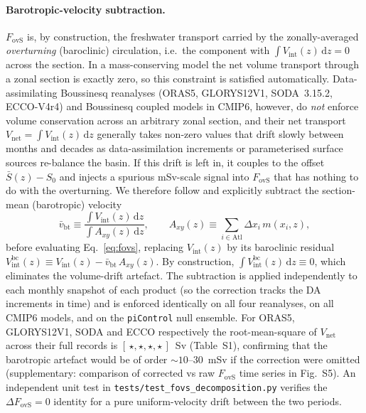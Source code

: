 \documentclass[12pt,a4paper]{article}
\newcommand{\Fovs}{F_\mathrm{ovS}}
\begin{document}
\paragraph{Barotropic-velocity subtraction.}
$\Fovs$ is, by construction, the freshwater transport carried by
the zonally-averaged \emph{overturning} (baroclinic) circulation,
i.e.\ the component with $\int V_\mathrm{int}(z)\,\mathrm{d}z = 0$
across the section. In a mass-conserving model the net volume
transport through a zonal section is exactly zero, so this
constraint is satisfied automatically. Data-assimilating Boussinesq
reanalyses (ORAS5, GLORYS12V1, SODA~3.15.2, ECCO-V4r4) and
Boussinesq coupled models in CMIP6, however, do \emph{not} enforce
volume conservation across an arbitrary zonal section, and their
net transport $V_\mathrm{net} = \int V_\mathrm{int}(z)\,\mathrm{d}z$
generally takes non-zero values that drift slowly between months and
decades as data-assimilation increments or parameterised surface
sources re-balance the basin. If this drift is left in, it couples
to the offset $\bar{S}(z) - S_0$ and injects a spurious mSv-scale
signal into $\Fovs$ that has nothing to do with the overturning.
We therefore follow \citet{deVriesWeber2005, Mecking2017, Weijer2019}
and explicitly subtract the section-mean (barotropic) velocity
\begin{equation}
\bar{v}_\mathrm{bt} \equiv
   \frac{\int V_\mathrm{int}(z)\,\mathrm{d}z}
        {\int A_{xy}(z)\,\mathrm{d}z},
  \qquad
A_{xy}(z) \equiv \sum_{i\in\mathrm{Atl}} \Delta x_i\,m(x_i, z),
\label{eq:vbar}
\end{equation}
before evaluating Eq.~\eqref{eq:fovs}, replacing $V_\mathrm{int}(z)$
by its baroclinic residual
$V_\mathrm{int}^{\mathrm{bc}}(z) \equiv V_\mathrm{int}(z) -
\bar{v}_\mathrm{bt}\,A_{xy}(z)$. By construction,
$\int V_\mathrm{int}^{\mathrm{bc}}(z)\,\mathrm{d}z \equiv 0$, which
eliminates the volume-drift artefact. The subtraction is applied
independently to each monthly snapshot of each product (so the
correction tracks the DA increments in time) and is enforced
identically on all four reanalyses, on all CMIP6 models, and on the
\texttt{piControl} null ensemble. For ORAS5, GLORYS12V1, SODA and
ECCO respectively the root-mean-square of $V_\mathrm{net}$ across
their full records is $[\,\star, \star, \star, \star\,]$~Sv
(Table~S1), confirming that the barotropic artefact would be of
order $\sim 10$--$30$~mSv if the correction were omitted
(supplementary: comparison of corrected vs raw $\Fovs$ time series
in Fig.~S5). An independent unit test in
\texttt{tests/test\_fovs\_decomposition.py} verifies the
$\Delta\Fovs = 0$ identity for a pure uniform-velocity drift
between the two periods.
\end{document}
